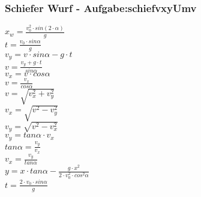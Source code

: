 \subsubsection{Schiefer Wurf  - Aufgabe:schiefvxyUmv} 
\begin{minipage}{0.45\textwidth} 
$ x_{w}  = \frac{v_{0} ^{2} \cdot sin(2\cdot \alpha )}{       g} $\\ 
$ t =\frac{v_{0} \cdot sin \alpha }{  g} $\\ 
$ v_{y}  =  v\cdot sin\alpha - g\cdot t $\\ 
$ v= \frac{ v_{y} +g\cdot t}{ sin\alpha } $\\ 
$ v_{x}  = v\cdot  cos\alpha $\\ 
$ v= \frac{ v_{x} }{ cos\alpha } $\\ 
$ v= \sqrt{ v_{x} ^{2} + v_{y} ^{2} } $\\ 
$ v_{x} = \sqrt{ v^{2}  - v_{y} ^{2} } $\\ 
$ v_{y} = \sqrt{ v^{2}  - v_{x} ^{2} } $\\ 
$ v_{y} = tan \alpha \cdot  v_{x} $\\ 
$ tan \alpha = \frac{v_{y} }{v_{x} } $\\ 
$ v_{x} = \frac{v_{y} }{tan \alpha } $\\ 
$ y = x\cdot tan \alpha  - \frac{   g\cdot x^{2} }{2\cdot v^{2} _{0} \cdot cos ^{2}\alpha } $\\ 
$ t =\frac{2\cdot v_{0} \cdot sin \alpha }{ g} $\\ 
\end{minipage} 
\begin{minipage}{0.45\textwidth} 
 
\end{minipage} 

